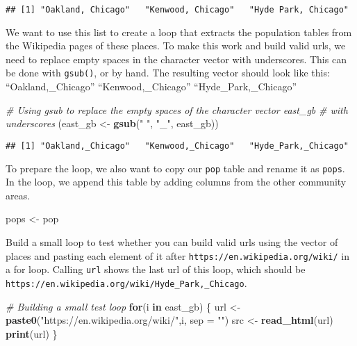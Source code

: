 \documentclass[
]{article}
\newenvironment{Shaded}{\begin{snugshade}}{\end{snugshade}}
\newcommand{\AttributeTok}[1]{\textcolor[rgb]{0.13,0.29,0.53}{#1}}
\newcommand{\CommentTok}[1]{\textcolor[rgb]{0.56,0.35,0.01}{\textit{#1}}}
\newcommand{\ControlFlowTok}[1]{\textcolor[rgb]{0.13,0.29,0.53}{\textbf{#1}}}
\newcommand{\FunctionTok}[1]{\textcolor[rgb]{0.13,0.29,0.53}{\textbf{#1}}}
\newcommand{\NormalTok}[1]{#1}
\newcommand{\OtherTok}[1]{\textcolor[rgb]{0.56,0.35,0.01}{#1}}
\newcommand{\StringTok}[1]{\textcolor[rgb]{0.31,0.60,0.02}{#1}}
\begin{document}
\begin{verbatim}
## [1] "Oakland, Chicago"   "Kenwood, Chicago"   "Hyde Park, Chicago"
\end{verbatim}

We want to use this list to create a loop that extracts the population
tables from the Wikipedia pages of these places. To make this work and
build valid urls, we need to replace empty spaces in the character
vector with underscores. This can be done with \texttt{gsub()}, or by
hand. The resulting vector should look like this: ``Oakland,\_Chicago''
``Kenwood,\_Chicago'' ``Hyde\_Park,\_Chicago''

\begin{Shaded}
\begin{Highlighting}[]
\CommentTok{\# Using gsub to replace the empty spaces of the character vector east\_gb}
\CommentTok{\# with underscores}
\NormalTok{(east\_gb }\OtherTok{\textless{}{-}} \FunctionTok{gsub}\NormalTok{(}\StringTok{" "}\NormalTok{, }\StringTok{"\_"}\NormalTok{, east\_gb))}
\end{Highlighting}
\end{Shaded}

\begin{verbatim}
## [1] "Oakland,_Chicago"   "Kenwood,_Chicago"   "Hyde_Park,_Chicago"
\end{verbatim}

To prepare the loop, we also want to copy our \texttt{pop} table and
rename it as \texttt{pops}. In the loop, we append this table by adding
columns from the other community areas.

\begin{Shaded}
\begin{Highlighting}[]
\NormalTok{pops }\OtherTok{\textless{}{-}}\NormalTok{ pop}
\end{Highlighting}
\end{Shaded}

Build a small loop to test whether you can build valid urls using the
vector of places and pasting each element of it after
\texttt{https://en.wikipedia.org/wiki/} in a for loop. Calling
\texttt{url} shows the last url of this loop, which should be
\texttt{https://en.wikipedia.org/wiki/Hyde\_Park,\_Chicago}.

\begin{Shaded}
\begin{Highlighting}[]
\CommentTok{\# Building a small test loop}
\ControlFlowTok{for}\NormalTok{(i }\ControlFlowTok{in}\NormalTok{ east\_gb) \{}
\NormalTok{   url }\OtherTok{\textless{}{-}} \FunctionTok{paste0}\NormalTok{(}\StringTok{"https://en.wikipedia.org/wiki/"}\NormalTok{,i, }\AttributeTok{sep =} \StringTok{""}\NormalTok{)}
\NormalTok{   src }\OtherTok{\textless{}{-}} \FunctionTok{read\_html}\NormalTok{(url)}
  \FunctionTok{print}\NormalTok{(url)   \}}
\end{Highlighting}
\end{Shaded}
\end{document}
